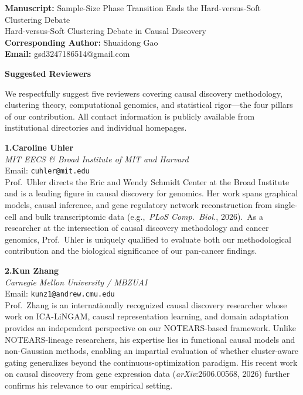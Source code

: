 \documentclass[11pt,a4paper]{article}
\begin{document}
\begin{flushright}
\normalsize
\textbf{Manuscript:} Sample-Size Phase Transition Ends the Hard-versus-Soft Clustering Debate\\
Hard-versus-Soft Clustering Debate in Causal Discovery\\[4pt]
\textbf{Corresponding Author:} Shuaidong Gao\\[2pt]
\textbf{Email:} gsd3247186514@gmail.com
\end{flushright}
\vspace{1em}

\begin{center}
{\LARGE\bfseries Suggested Reviewers}
\end{center}

\bigskip

We respectfully suggest five reviewers covering causal discovery
methodology, clustering theory, computational genomics, and
statistical rigor---the four pillars of our contribution. All
contact information is publicly available from institutional
directories and individual homepages.

\bigskip

\noindent\textbf{1.\quad Caroline Uhler}\\
\textit{MIT EECS \& Broad Institute of MIT and Harvard}\\[2pt]
Email: \texttt{cuhler@mit.edu}\\[2pt]
Prof.\ Uhler directs the Eric and Wendy Schmidt Center at the
Broad Institute and is a leading figure in causal discovery for
genomics. Her work spans graphical models, causal inference, and
gene regulatory network reconstruction from single-cell and bulk
transcriptomic data (e.g.,~\textit{PLoS Comp.\ Biol.}, 2026).\,
As a researcher at the intersection of causal discovery
methodology and cancer genomics, Prof.\ Uhler is uniquely
qualified to evaluate both our methodological contribution and
the biological significance of our pan-cancer findings.

\smallskip

\noindent\textbf{2.\quad Kun Zhang}\\
\textit{Carnegie Mellon University / MBZUAI}\\[2pt]
Email: \texttt{kunz1@andrew.cmu.edu}\\[2pt]
Prof.\ Zhang is an internationally recognized causal discovery
researcher whose work on ICA-LiNGAM, causal representation
learning, and domain adaptation provides an independent
perspective on our NOTEARS-based framework. Unlike
NOTEARS-lineage researchers, his expertise lies in functional
causal models and non-Gaussian methods, enabling an impartial
evaluation of whether cluster-aware gating generalizes beyond the
continuous-optimization paradigm. His recent work on causal
discovery from gene expression data (\textit{arXiv}:2606.00568,
2026) further confirms his relevance to our empirical setting.
\end{document}
